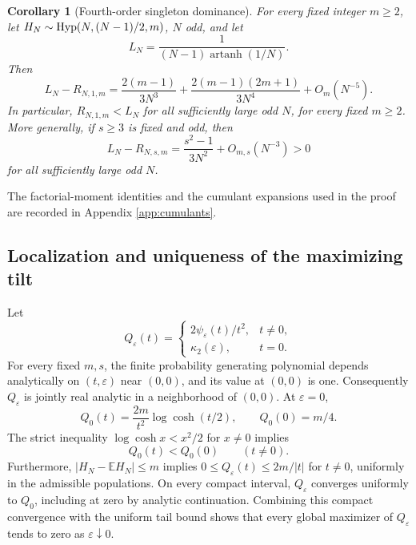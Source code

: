 \documentclass[11pt,a4paper]{article}
\newtheorem{corollary}[theorem]{Corollary}
\newcommand{\E}{\mathbb E}\newcommand{\R}{\mathbb R}\newcommand{\N}{\mathbb N}\newcommand{\one}{\mathbf1}
\begin{document}
\begin{corollary}[Fourth-order singleton dominance]\label{cor:fixedm_gap}
For every fixed integer $m\ge2$, let $H_N\sim\operatorname{Hyp}(N,(N-1)/2,m)$, $N$ odd, and let
\[
 L_N=\frac{1}{(N-1)\operatorname{artanh}(1/N)}.
\]
Then
\begin{equation}\label{eq:fixedgap}
 \boxed{\quad L_N-R_{N,1,m}
 =\frac{2(m-1)}{3N^3}
 +\frac{2(m-1)(2m+1)}{3N^4}+O_m(N^{-5}).\quad}
\end{equation}
In particular, $R_{N,1,m}<L_N$ for all sufficiently large odd $N$, for every fixed $m\ge2$. More generally, if $s\ge3$ is fixed and odd, then
\begin{equation}\label{eq:offs_gap}
 L_N-R_{N,s,m}=\frac{s^2-1}{3N^2}+O_{m,s}(N^{-3})>0
\end{equation}
for all sufficiently large odd $N$.
\end{corollary}

The factorial-moment identities and the cumulant expansions used in the proof are recorded in Appendix \ref{app:cumulants}.

\subsection{Localization and uniqueness of the maximizing tilt}
Let
\[
 Q_\varepsilon(t)=\begin{cases}
  2\psi_\varepsilon(t)/t^2,&t\ne0,\\
  \kappa_2(\varepsilon),&t=0.
 \end{cases}
\]
For every fixed $m,s$, the finite probability generating polynomial depends analytically on $(t,\varepsilon)$ near $(0,0)$, and its value at $(0,0)$ is one. Consequently $Q_\varepsilon$ is jointly real analytic in a neighborhood of $(0,0)$. At $\varepsilon=0$,
\begin{equation}\label{eq:q0}
 Q_0(t)=\frac{2m}{t^2}\log\cosh(t/2),\qquad Q_0(0)=m/4.
\end{equation}
The strict inequality $\log\cosh x<x^2/2$ for $x\ne0$ implies
\begin{equation}\label{eq:qstrict}
 Q_0(t)<Q_0(0)\qquad(t\ne0).
\end{equation}
Furthermore, $|H_N-\E H_N|\le m$ implies $0\le Q_\varepsilon(t)\le2m/|t|$ for $t\ne0$, uniformly in the admissible populations. On every compact interval, $Q_\varepsilon$ converges uniformly to $Q_0$, including at zero by analytic continuation. Combining this compact convergence with the uniform tail bound shows that every global maximizer of $Q_\varepsilon$ tends to zero as $\varepsilon\downarrow0$.
\end{document}
